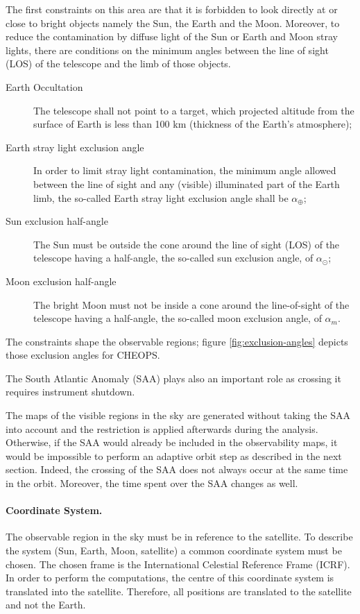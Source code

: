 \documentclass[a4paper,10pt]{article}
\begin{document}
The first constraints on this area are that it is forbidden to look directly at or close to bright objects namely the Sun, the Earth and the Moon. Moreover, to reduce the contamination by diffuse light of the Sun or Earth and Moon stray lights, there are conditions on the minimum angles between the line of sight (LOS) of the telescope and the limb of those objects. 
\begin{description}
 \item [Earth Occultation] The telescope shall not point to a target, which projected altitude from the surface of Earth is less than 100 km (thickness of the Earth's atmosphere);
 \item [Earth stray light exclusion angle] In order to limit stray light contamination, the minimum angle allowed between the line of sight and any (visible) illuminated part of the Earth limb, the so-called Earth stray light exclusion angle shall be $\alpha_\oplus$;
 \item [Sun exclusion half-angle] The Sun must be outside the cone around the line of sight (LOS) of the telescope having a half-angle, the so-called sun exclusion angle, of $\alpha_\odot$;
 \item [Moon exclusion half-angle] The bright Moon must not be inside a cone around the line-of-sight of the
telescope having a half-angle, the so-called moon exclusion angle, of $\alpha_m$.
\end{description}
The constraints shape the observable regions; figure \ref{fig:exclusion-angles} depicts those exclusion angles for CHEOPS.

The South Atlantic Anomaly (SAA) plays also an important role as crossing it requires instrument shutdown.

The maps of the visible regions in the sky are generated without taking the SAA into account and the restriction is applied afterwards during the analysis. Otherwise, if the SAA would already be included in the observability maps, it would be impossible to perform an adaptive orbit step as described in the next section. Indeed, the crossing of the SAA does not always occur at the same time in the orbit. Moreover, the time spent over the SAA changes as well.

\paragraph{Coordinate System.} The observable region in the sky must be in reference to the satellite. To describe the system (Sun, Earth, Moon, satellite) a common coordinate system must be chosen. The chosen frame is the International Celestial Reference Frame (ICRF). In order to perform the computations, the centre of this coordinate system is translated into the satellite. Therefore, all positions are translated to the satellite and not the Earth.
\end{document}
